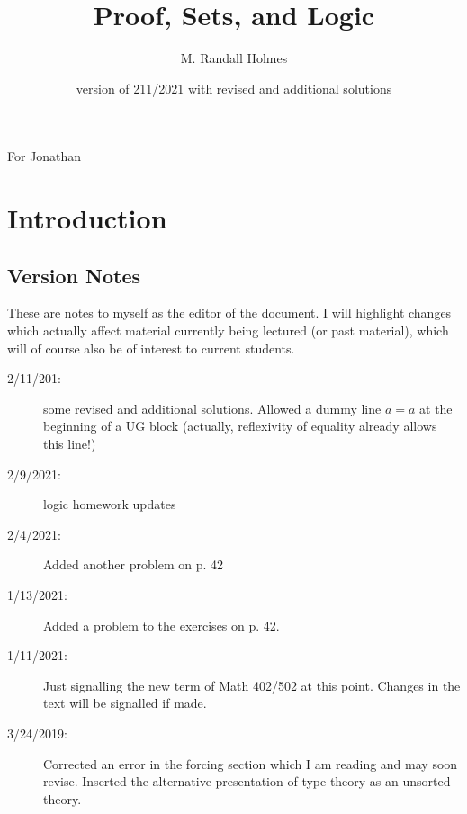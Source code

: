 \documentclass[12pt]{book}
\title{Proof, Sets, and Logic}
\author{M. Randall Holmes}
\date{version of 211/2021 with revised and additional solutions}
\begin{document}
\maketitle

\newpage

\begin{centering}
For Jonathan\\
\end{centering}

\newpage

\tableofcontents

\newpage

\section{Introduction}

{\tiny

\subsection{Version Notes}

These are notes to myself as the editor of the document.  I will
highlight changes which actually affect material currently being
lectured (or past material), which will of course also be of interest
to current students.

\begin{description}

\item[2/11/201:]  some revised and additional solutions.  Allowed a dummy line $a=a$ at the beginning of a UG block (actually, reflexivity of equality already allows this line!)

\item[2/9/2021:]  logic homework updates

\item[2/4/2021:]  Added another problem on p. 42

\item[1/13/2021:]  Added a problem to the exercises on p. 42.

\item[1/11/2021:]  Just signalling the new term of Math 402/502 at this point.  Changes in the text will be signalled if made.

\item[3/24/2019:]  Corrected an error in the forcing section which I am reading and may soon revise.  Inserted the alternative presentation of type theory as an unsorted theory.


\end{description}}
\end{document}
